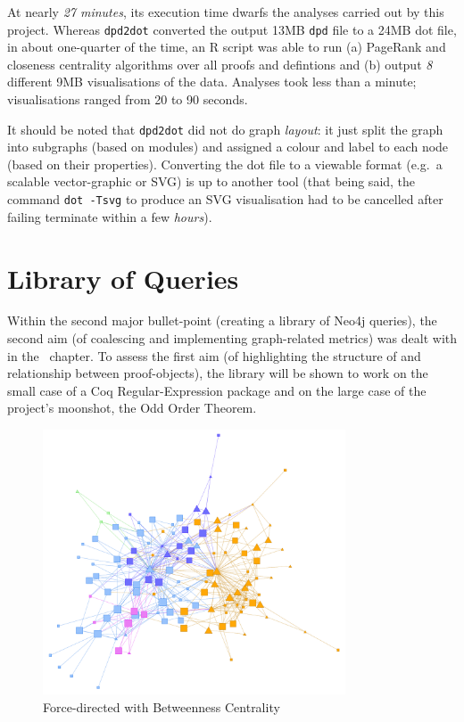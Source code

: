 At nearly \emph{27 minutes}, its execution time dwarfs the analyses carried out
by this project. Whereas \texttt{dpd2dot} converted the output 13MB \texttt{dpd}
file to a 24MB dot file, in about one-quarter of the time, an R script was able
to run (a) PageRank and closeness centrality algorithms over all proofs and
defintions and (b) output \emph{8} different 9MB visualisations of the data.
Analyses took less than a minute; visualisations ranged from 20 to 90 seconds.

It should be noted that \texttt{dpd2dot} did not do graph \emph{layout}: it just
split the graph into subgraphs (based on modules) and assigned a colour and label
to each node (based on their properties). Converting the dot file to a viewable
format (e.g.\ a scalable vector-graphic or SVG) is up to another tool (that
being said, the command \texttt{dot -Tsvg} to produce an SVG visualisation had to
be cancelled after failing terminate within a few \emph{hours}).

\section{Library of Queries}\label{sec:libeval}

Within the second major bullet-point (creating a library of Neo4j queries), the
second aim (of coalescing and implementing graph-related metrics) was dealt
with in the~ chapter. To assess the first aim (of
highlighting the structure of and relationship between proof-objects), the
library will be shown to work on the small case of a Coq Regular-Expression
package and on the large case of the project's moonshot, the Odd Order Theorem.

\begin{figure}[p]
\centering
\includegraphics[width=0.8\textwidth]{img/regexp/direct.png}
\caption{Force-directed with Betweenness Centrality}\label{fig:regexp:direct}
\end{figure}

